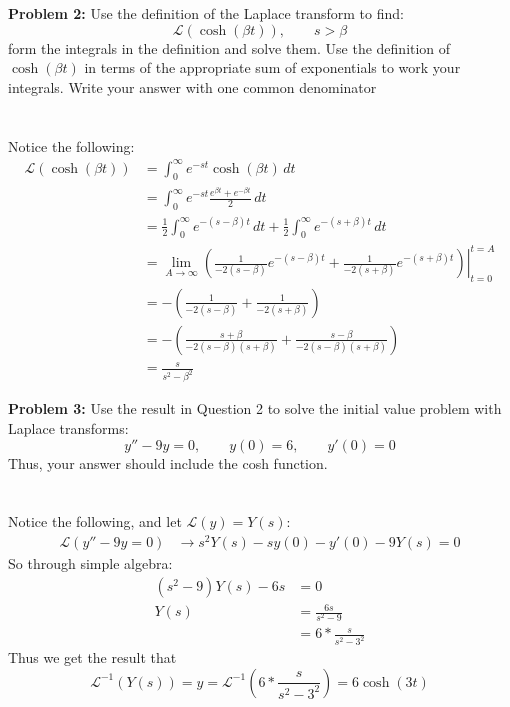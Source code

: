 \documentclass[12pt]{article}
\begin{document}
\newpage

\noindent \textbf{Problem 2: }Use the definition of the Laplace transform to find:	
	$$
	\mathcal{L}(\cosh(\beta t)), \qquad s>\beta
	$$
form the integrals in the definition and solve them. Use the definition of $\cosh(\beta t)$ in terms of the appropriate sum of exponentials to work your integrals. Write your answer with one common denominator
\\ \\ \\
Notice the following:
	\begin{align*}
		\mathcal{L}(\cosh(\beta t)) &= \int_{0}^{\infty} e^{-st}\cosh(\beta t)\,dt \\
		&= \int_{0}^{\infty} e^{-st}\frac{e^{\beta t} + e^{-\beta t}}{2}\,dt \\
		&= \frac{1}{2}\int_{0}^{\infty} e^{-(s-\beta)t}\,dt + \frac{1}{2}\int_{0}^{\infty} e^{-(s+\beta)t}\,dt \\
		&= \lim\limits_{A \rightarrow \infty}\left.\left( \frac{1}{-2(s-\beta)} e^{-(s-\beta)t} + \frac{1}{-2(s+\beta)} e^{-(s+\beta)t} \right)\right|^{t=A}_{t=0} \\
		&= -\left(\frac{1}{-2(s-\beta)} + \frac{1}{-2(s+\beta)} \right) \\
		&= -\left(\frac{s+\beta}{-2(s-\beta)(s+\beta)} + \frac{s-\beta}{-2(s-\beta)(s+\beta)} \right) \\ 
		&= \frac{s}{s^2 - \beta^2}
	\end{align*}	

\newpage 

\noindent \textbf{Problem 3: }Use the result in Question 2 to solve the initial value problem with Laplace transforms:
	$$
	y'' - 9y = 0, \qquad y(0)=6, \qquad y'(0) = 0
	$$
Thus, your answer should include the cosh function.
\\ \\ \\
Notice the following, and let $\mathcal{L}(y) = Y(s)$:
	\begin{align*}
		\mathcal{L}\left(y'' - 9y = 0\right) &\rightarrow s^2Y(s) - sy(0) - y'(0) - 9Y(s) = 0
	\end{align*}
So through simple algebra:
	\begin{align*}
		(s^2-9)Y(s) - 6s &= 0 \\
		Y(s) &= \frac{6s}{s^2 - 9} \\
		&= 6*\frac{s}{s^2 - 3^2}
	\end{align*}
Thus we get the result that 
	$$
	\mathcal{L}^{-1}(Y(s)) = y = \mathcal{L}^{-1}\left(6*\frac{s}{s^2 - 3^2}\right) = 6\cosh(3t)
	$$
	
\end{document}
